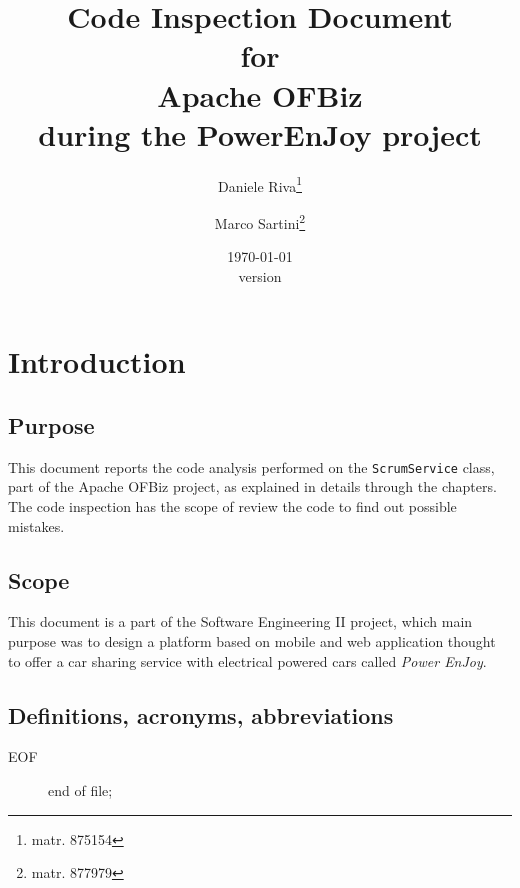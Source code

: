\documentclass{scrreprt}
\title{Code Inspection Document\\for\\Apache OFBiz\textsuperscript{\textregistered}\\during the PowerEnJoy project}
\date{\today\\\bigskip version \version}
\author{Daniele Riva\thanks{matr. 875154}\and Marco Sartini\thanks{matr. 877979}}
\begin{document}
\pagestyle{headings}
\maketitle

\tableofcontents

\chapter{Introduction}

\section{Purpose}
This document reports the code analysis performed on the \texttt{ScrumService} class, part of the Apache OFBiz project, as explained in details through the chapters.
The code inspection has the scope of review the code to find out possible mistakes.

\section{Scope}
This document is a part of the Software Engineering II project, which main purpose was to design a platform based on mobile and web application thought to offer a car sharing service with electrical powered cars called \emph{Power EnJoy}. 


\section{Definitions, acronyms, abbreviations}
\begin{description}
\item[EOF] end of file;

\end{description}

\begin{comment}
\section{Reference documents}
\begin{itemize}
\item RASD v1.0 available at \url{https://github.com/marcosartini/PowerEnJoy/blob/master/releases/rasdPowerEnJoy.pdf}
\item DD v1.0 available at \url{https://github.com/marcosartini/PowerEnJoy/blob/master/releases/dd.pdf}
\item ITPD v1.0 available at \url{https://github.com/marcosartini/PowerEnJoy/blob/master/releases/itpd.pdf}
\end{itemize}
\end{comment}
\end{document}
